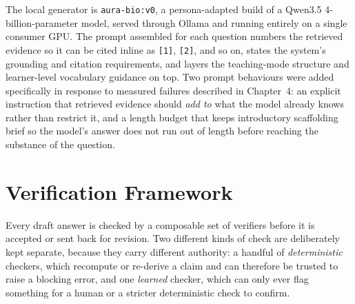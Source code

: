 The local generator is \texttt{aura-bio:v0}, a persona-adapted build of a
Qwen3.5 4-billion-parameter model, served
through Ollama and running entirely on a single consumer GPU. The prompt
assembled for each question numbers the retrieved evidence so it can be
cited inline as \texttt{[1]}, \texttt{[2]}, and so on, states the
system's grounding and citation requirements, and layers the teaching-mode
structure and learner-level vocabulary guidance on top. Two prompt
behaviours were added specifically in response to measured failures
described in Chapter~4: an explicit instruction that retrieved evidence
should \emph{add to} what the model already knows rather than restrict it,
and a length budget that keeps introductory scaffolding brief so the
model's answer does not run out of length before reaching the substance of
the question.

\section{Verification Framework}\label{3.6}

Every draft answer is checked by a composable set of verifiers before it
is accepted or sent back for revision. Two different kinds of check are
deliberately kept separate, because they carry different authority: a
handful of \emph{deterministic} checkers, which recompute or re-derive a
claim and can therefore be trusted to raise a blocking error, and one
\emph{learned} checker, which can only ever flag something for a human or
a stricter deterministic check to confirm.


